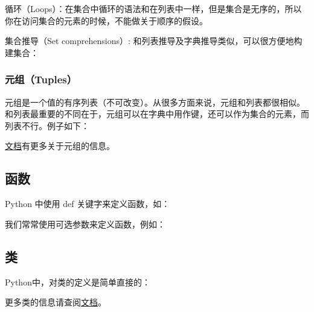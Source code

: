 循环（Loops）：在集合中循环的语法和在列表中一样，但是集合是无序的，所以你在访问集合的元素的时候，不能做关于顺序的假设。



集合推导（Set comprehensions）: 和列表推导及字典推导类似，可以很方便地构建集合：


\subsubsection{元组（Tuples）}


元组是一个值的有序列表（不可改变）。从很多方面来说，元组和列表都很相似。和列表最重要的不同在于，元组可以在字典中用作键，还可以作为集合的元素，而列表不行。例子如下：

\href{https://docs.python.org/3.5/tutorial/datastructures.html#tuples-and-sequences}{文档}有更多关于元组的信息。

\subsection{函数}


Python 中使用 def 关键字来定义函数，如：



我们常常使用可选参数来定义函数，例如：



\subsection{类}


Python中，对类的定义是简单直接的：



更多类的信息请查阅\href{https://docs.python.org/3.5/tutorial/classes.html}{文档}。
